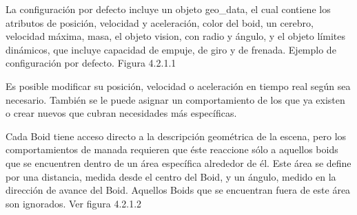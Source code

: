 La configuración por defecto incluye un objeto geo\_data, el cual contiene los atributos de posición, velocidad y aceleración, color del 
boid, un cerebro, velocidad máxima, masa, el objeto vision, con radio y ángulo, y el objeto límites dinámicos, que incluye capacidad de 
empuje, de giro y de frenada. Ejemplo de configuración por defecto. Figura 4.2.1.1

Es posible modificar su posición, velocidad o aceleración en tiempo real según sea necesario. También se le puede asignar un comportamiento 
de los que ya existen o crear nuevos que cubran necesidades más específicas.

Cada Boid tiene acceso directo a la descripción geométrica de la escena, pero los comportamientos de manada requieren que éste reaccione 
sólo a aquellos boids que se encuentren dentro de un área específica alrededor de él. Este área se define por una distancia, medida desde 
el centro del Boid, y un ángulo, medido en la dirección de avance del Boid. Aquellos Boids que se encuentran fuera de este área son ignorados. Ver figura 4.2.1.2\newline


